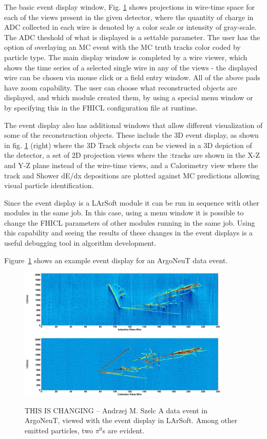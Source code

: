 \documentclass[12pt]{elsarticle}
\begin{document}
The basic event display window, Fig. \ref{argo.evd} shows projections in wire-time space for each of the views present in the given detector, where the quantity of charge in ADC collected in each wire is denoted by a color scale or intensity of gray-scale. The ADC theshold of what is displayed is a settable parameter. 
The user has the option of overlaying an MC event with the MC truth tracks color coded by particle type. The main display window is completed by a wire viewer, which shows the time series of a selected single wire in any of the views - the displayed wire can be chosen via mouse click or a field entry window.
All of the above pads have zoom capability. The user can choose what reconstructed objects are displayed, and which module created them, by using a special menu window or by specifying this in the FHICL configuration file at runtime. 

The event display also has additional windows that allow different visualization of some of the reconstruction objects. These include the 3D event display, as shown in fig. \ref{argo.evd} (right) where the 3D Track objects can be viewed in a 3D depiction of the detector, a set of 2D projection views where the :tracks are shown in the X-Z and Y-Z plane instead of the wire-time views, and a Calorimetry view where the track and Shower dE/dx depositions are plotted against MC predictions allowing visual particle identification. 

Since the event display is a LArSoft module it can be run in sequence with other modules in the same job. In this case, using a menu window it is possible to change the FHICL parameters of other modules running in the same job. Using this capability and seeing the results of these changes in the event displays is a useful debugging tool in algorithm development.

Figure~\ref{argo.evd} shows an example event display for an ArgoNeuT data event.

\hspace*{2cm}
\begin{figure}[h]
\centering
\caption{THIS IS CHANGING -- Andrzej M. Szelc A data event in ArgoNeuT, viewed with the event display in LArSoft. Among other emitted particles, two $\pi^0$s are evident.}
\includegraphics[width=4.0in]{./imgs/ArgoNeuT_event.jpg}
\label{argo.evd}
\end{figure}
\end{document}

